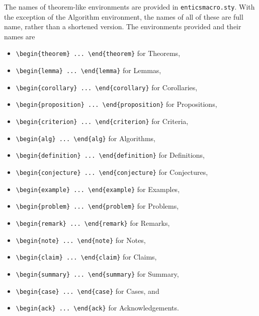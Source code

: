 \documentclass[twoside,11pt]{entics}
\begin{document}
The names of theorem-like environments are provided in
\texttt{enticsmacro.sty}. With the exception of the Algorithm environment, the
names of all of these are full name, rather than a shortened version. The
environments provided and their names are
\begin{itemize}
  \item \verb+\begin{theorem} ... \end{theorem}+ for Theorems,
  \item \verb+\begin{lemma} ... \end{lemma}+ for Lemmas,
  \item \verb+\begin{corollary} ... \end{corollary}+ for Corollaries,
  \item \verb+\begin{proposition} ... \end{proposition}+ for
        Propositions,
  \item \verb+\begin{criterion} ... \end{criterion}+ for Criteria,
  \item \verb+\begin{alg} ... \end{alg}+ for Algorithms,
  \item \verb+\begin{definition} ... \end{definition}+ for Definitions,
  \item \verb+\begin{conjecture} ... \end{conjecture}+ for Conjectures,
  \item \verb+\begin{example} ... \end{example}+ for Examples,
  \item \verb+\begin{problem} ... \end{problem}+ for Problems,
  \item \verb+\begin{remark} ... \end{remark}+ for Remarks,
  \item \verb+\begin{note} ... \end{note}+ for Notes,
  \item \verb+\begin{claim} ... \end{claim}+ for Claims,
  \item \verb+\begin{summary} ... \end{summary}+ for Summary,
  \item \verb+\begin{case} ... \end{case}+ for Cases, and
  \item \verb+\begin{ack} ... \end{ack}+ for Acknowledgements.
\end{itemize}
\end{document}
